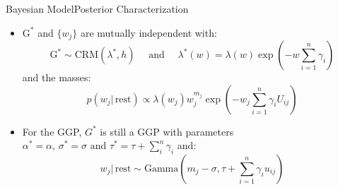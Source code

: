 \documentclass[aspectratio=169,xcolor=dvipsnames]{beamer}
\begin{document}
\begin{frame}{Bayesian Model}{Posterior Characterization}
\setlength{\leftmargini}{0.2cm}
\begin{itemize}
    \item $\text{G}^{*}$ and $\{w_j\}$ are mutually independent with:
    $$
    \text{G}^{*} \sim \text{CRM}(\lambda^{*}, h) \quad \text{ and } \quad \lambda^{*}(w) = \lambda(w) \exp(-w\sum_{i=1}^{n}\gamma_{i})
    $$
    and the masses:
    $$
    p(w_{j}| \, \text{rest}) \propto \lambda(w_{j}) w_{j}^{m_{j}} \exp(-w_{j} \sum_{i=1}^{n}\gamma_{i}U_{ij})
    $$
    
    \item For the GGP, $ G^{*}$ is still a GGP with parameters $\alpha^{*}=\alpha,\, \sigma^{*}= \sigma \text{ and } \tau^{*} = \tau +\sum_i^{n}\gamma_{i}$ and:
    $$
    w_{j}| \, \text{rest} \sim \text{Gamma}(m_{j} - \sigma, \tau + \sum_{i=1}^{n}\gamma_i u_{ij} )
    $$
\end{itemize}
\end{frame}
\end{document}
